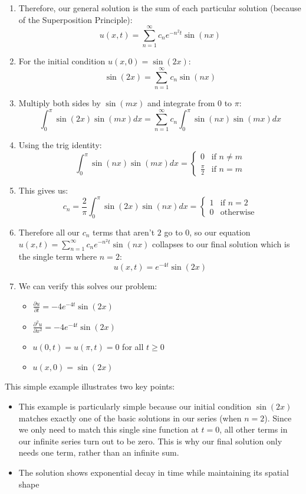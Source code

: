 \begin{example}
\begin{solution}
\begin{enumerate}
\item Therefore, our general solution is the sum of each particular solution (because of the Superposition Principle):
   \[
   u(x,t) = \sum_{n=1}^{\infty} c_n e^{-n^2t}\sin(nx)
   \]

\item For the initial condition $u(x,0) = \sin(2x)$:
   \[
   \sin(2x) = \sum_{n=1}^{\infty} c_n\sin(nx)
   \]

\item Multiply both sides by $\sin(mx)$ and integrate from 0 to $\pi$:
   \[
   \int_0^\pi \sin(2x)\sin(mx)dx = \sum_{n=1}^{\infty} c_n\int_0^\pi \sin(nx)\sin(mx)dx
   \]

\item Using the trig identity:
   \[
   \int_0^\pi \sin(nx)\sin(mx)dx = \begin{cases}
   0 & \text{if } n \neq m \\
   \frac{\pi}{2} & \text{if } n = m
   \end{cases}
   \]

\item This gives us:
   \[
   c_n = \frac{2}{\pi}\int_0^\pi \sin(2x)\sin(nx)dx = \begin{cases}
   1 & \text{if } n = 2 \\
   0 & \text{otherwise}
   \end{cases}
   \]

\item Therefore all our $c_n$ terms that aren't $2$ go to $0$, so our equation $u(x,t) = \sum_{n=1}^{\infty} c_n e^{-n^2t}\sin(nx)$ collapses to our final solution which is the single term where $n=2$:
   \[
   u(x,t) = e^{-4t}\sin(2x)
   \]

\item We can verify this solves our problem:
   \begin{itemize}
   \item $\frac{\partial u}{\partial t} = -4e^{-4t}\sin(2x)$
   \item $\frac{\partial^2 u}{\partial x^2} = -4e^{-4t}\sin(2x)$
   \item $u(0,t) = u(\pi,t) = 0$ for all $t \geq 0$
   \item $u(x,0) = \sin(2x)$
   \end{itemize}
\end{enumerate}

\noindent This simple example illustrates two key points:
\begin{itemize}
\item This example is particularly simple because our initial condition $\sin(2x)$ matches exactly one of the basic solutions in our series (when $n=2$). Since we only need to match this single sine function at $t=0$, all other terms in our infinite series turn out to be zero. This is why our final solution only needs one term, rather than an infinite sum.
   \item The solution shows exponential decay in time while maintaining its spatial shape
\end{itemize}
\end{solution}
\end{example}
